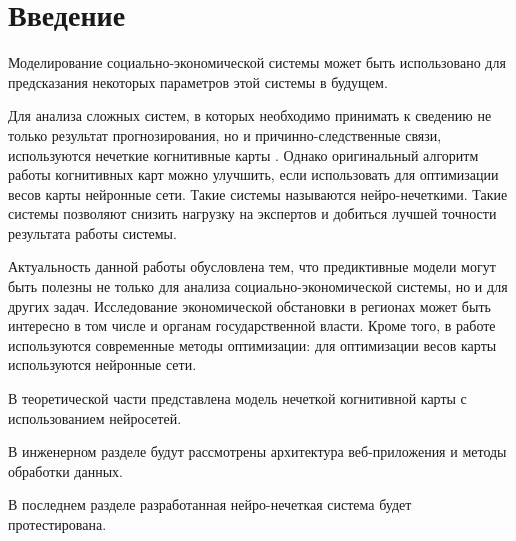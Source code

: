 \chapter*{Введение}
\label{sec:afterwords}

Моделирование социально-экономической системы может быть использовано для предсказания
некоторых параметров этой системы в будущем.

Для анализа сложных систем, в которых необходимо принимать к сведению не только результат прогнозирования, но и причинно-следственные связи, используются нечеткие когнитивные карты \cite{osoba2019dags} \cite{kosko1986fuzzy}. Однако оригинальный алгоритм работы когнитивных карт можно улучшить, если использовать для оптимизации весов карты нейронные сети. Такие системы называются нейро-нечеткими. Такие системы позволяют снизить нагрузку на экспертов и добиться лучшей точности результата работы системы.

Актуальность данной работы обусловлена тем, что предиктивные модели
могут быть полезны не только для анализа социально-экономической системы, но и для других задач.
Исследование экономической обстановки в регионах может быть интересно в том числе и органам государственной власти.
Кроме того, в работе используются современные методы оптимизации: для оптимизации весов карты используются нейронные сети.

В теоретической части представлена модель нечеткой когнитивной карты с использованием
нейросетей.

В инженерном разделе будут рассмотрены архитектура веб-приложения и методы обработки данных.

В последнем разделе разработанная нейро-нечеткая система будет протестирована.